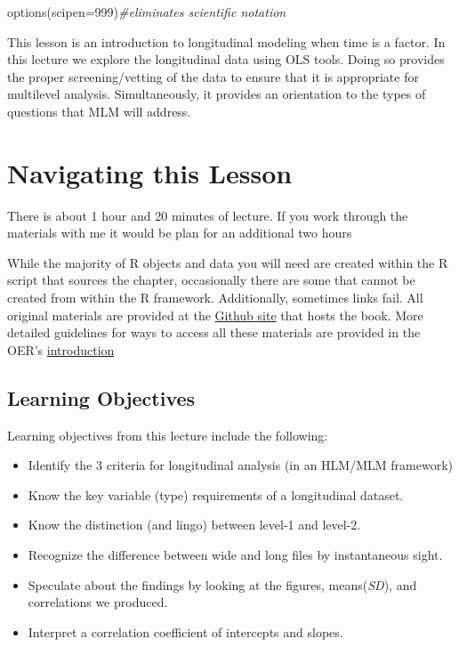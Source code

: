 \documentclass[
  english,
]{book}
\newenvironment{Shaded}{\begin{snugshade}}{\end{snugshade}}
\newcommand{\AttributeTok}[1]{\textcolor[rgb]{0.77,0.63,0.00}{#1}}
\newcommand{\CommentTok}[1]{\textcolor[rgb]{0.56,0.35,0.01}{\textit{#1}}}
\newcommand{\DecValTok}[1]{\textcolor[rgb]{0.00,0.00,0.81}{#1}}
\newcommand{\FunctionTok}[1]{\textcolor[rgb]{0.00,0.00,0.00}{#1}}
\newcommand{\NormalTok}[1]{#1}
\providecommand{\tightlist}{%
  \setlength{\itemsep}{0pt}\setlength{\parskip}{0pt}}
\begin{document}
\begin{Shaded}
\begin{Highlighting}[]
\FunctionTok{options}\NormalTok{(}\AttributeTok{scipen=}\DecValTok{999}\NormalTok{)}\CommentTok{\#eliminates scientific notation}
\end{Highlighting}
\end{Shaded}

This lesson is an introduction to longitudinal modeling when time is a factor. In this lecture we explore the longitudinal data using OLS tools. Doing so provides the proper screening/vetting of the data to ensure that it is appropriate for multilevel analysis. Simultaneously, it provides an orientation to the types of questions that MLM will address.

\hypertarget{navigating-this-lesson-1}{%
\section{Navigating this Lesson}\label{navigating-this-lesson-1}}

There is about 1 hour and 20 minutes of lecture. If you work through the materials with me it would be plan for an additional two hours

While the majority of R objects and data you will need are created within the R script that sources the chapter, occasionally there are some that cannot be created from within the R framework. Additionally, sometimes links fail. All original materials are provided at the \href{https://github.com/lhbikos/ReC_CPA}{Github site} that hosts the book. More detailed guidelines for ways to access all these materials are provided in the OER's \protect\hyperlink{ReCintro}{introduction}

\hypertarget{learning-objectives-1}{%
\subsection{Learning Objectives}\label{learning-objectives-1}}

Learning objectives from this lecture include the following:

\begin{itemize}
\tightlist
\item
  Identify the 3 criteria for longitudinal analysis (in an HLM/MLM framework)
\item
  Know the key variable (type) requirements of a longitudinal dataset.
\item
  Know the distinction (and lingo) between level-1 and level-2.
\item
  Recognize the difference between wide and long files by instantaneous sight.
\item
  Speculate about the findings by looking at the figures, means(\emph{SD}), and correlations we produced.
\item
  Interpret a correlation coefficient of intercepts and slopes.
\end{itemize}
\end{document}
